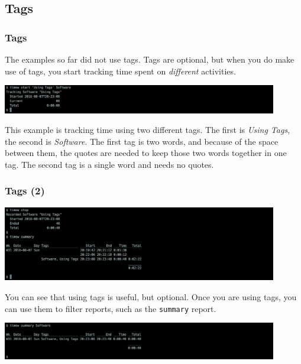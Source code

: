 \documentclass[t,handout]{beamer}
\begin{document}
\subsection{Tags}

\begin{frame}[fragile]\frametitle{Tags}
    \vfill
    The examples so far did not use tags. Tags are optional, but when you do make use of tags, you start tracking time spent on \textit{different} activities.

    \includegraphics[width=12cm]{images/tutorial8.png}

    This example is tracking time using two different tags. The first is \textit{Using Tags}, the second is \textit{Software}. The first tag is two words, and because of the space between them, the quotes are needed to keep those two words together in one tag. The second tag is a single word and needs no quotes.
\end{frame}

\begin{frame}[fragile]\frametitle{Tags (2)}
    \vfill
    \includegraphics[width=12cm]{images/tutorial9.png}

    You can see that using tags is useful, but optional. Once you are using tags, you can use them to filter reports, such as the \verb=summary= report.

    \includegraphics[width=12cm]{images/tutorial10.png}
\end{frame}
\end{document}
